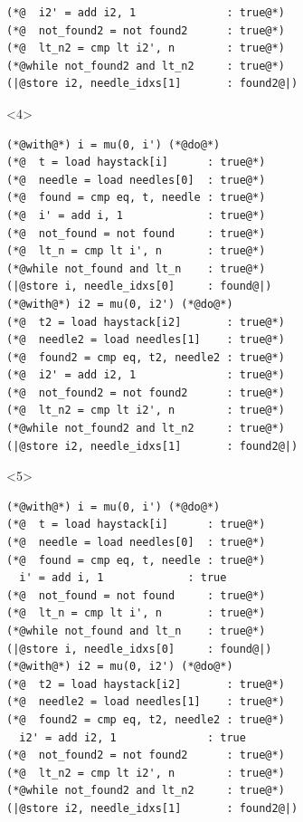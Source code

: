 \documentclass[aspectratio=169]{beamer}
\begin{document}
\begin{frame}[fragile]
\begin{figure}
\begin{onlyenv}
\begin{minipage}{0.45\textwidth}
\begin{lstlisting}
(*@  i2' = add i2, 1              : true@*)
(*@  not_found2 = not found2      : true@*)
(*@  lt_n2 = cmp lt i2', n        : true@*)
(*@while not_found2 and lt_n2     : true@*)
(|@store i2, needle_idxs[1]       : found2@|)
        \end{lstlisting}
      \end{minipage}
    \end{onlyenv}%
    \begin{onlyenv}<4>
      \begin{minipage}{0.45\textwidth}
        \begin{lstlisting}
(*@with@*) i = mu(0, i') (*@do@*)
(*@  t = load haystack[i]      : true@*)
(*@  needle = load needles[0]  : true@*)
(*@  found = cmp eq, t, needle : true@*)
(*@  i' = add i, 1             : true@*)
(*@  not_found = not found     : true@*)
(*@  lt_n = cmp lt i', n       : true@*)
(*@while not_found and lt_n    : true@*)
(|@store i, needle_idxs[0]     : found@|)
(*@with@*) i2 = mu(0, i2') (*@do@*)
(*@  t2 = load haystack[i2]       : true@*)
(*@  needle2 = load needles[1]    : true@*)
(*@  found2 = cmp eq, t2, needle2 : true@*)
(*@  i2' = add i2, 1              : true@*)
(*@  not_found2 = not found2      : true@*)
(*@  lt_n2 = cmp lt i2', n        : true@*)
(*@while not_found2 and lt_n2     : true@*)
(|@store i2, needle_idxs[1]       : found2@|)
        \end{lstlisting}
      \end{minipage}
    \end{onlyenv}%
    \begin{onlyenv}<5>
      \begin{minipage}{0.45\textwidth}
        \begin{lstlisting}
(*@with@*) i = mu(0, i') (*@do@*)
(*@  t = load haystack[i]      : true@*)
(*@  needle = load needles[0]  : true@*)
(*@  found = cmp eq, t, needle : true@*)
  i' = add i, 1             : true
(*@  not_found = not found     : true@*)
(*@  lt_n = cmp lt i', n       : true@*)
(*@while not_found and lt_n    : true@*)
(|@store i, needle_idxs[0]     : found@|)
(*@with@*) i2 = mu(0, i2') (*@do@*)
(*@  t2 = load haystack[i2]       : true@*)
(*@  needle2 = load needles[1]    : true@*)
(*@  found2 = cmp eq, t2, needle2 : true@*)
  i2' = add i2, 1              : true
(*@  not_found2 = not found2      : true@*)
(*@  lt_n2 = cmp lt i2', n        : true@*)
(*@while not_found2 and lt_n2     : true@*)
(|@store i2, needle_idxs[1]       : found2@|)
        \end{lstlisting}
      \end{minipage}

\end{onlyenv}
\end{figure}
\end{frame}
\end{document}
